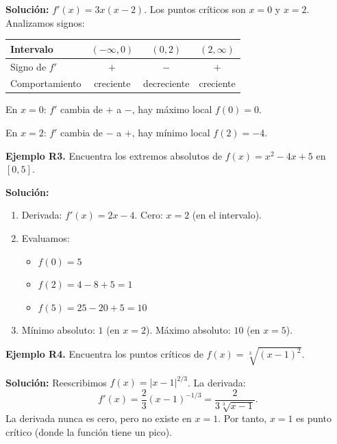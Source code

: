\documentclass[12pt, a4paper]{article}
\begin{document}
\begin{cuadrosolucion}
  \textbf{Solución:} $f'(x) = 3x(x - 2)$. Los puntos críticos son $x = 0$ y $x = 2$. Analizamos signos:
  \begin{center}
    \small
    \begin{tabular}{lccc}
      \toprule
      \textbf{Intervalo} & $(-\infty, 0)$ & $(0, 2)$    & $(2, \infty)$ \\
      \midrule
      Signo de $f'$      & $+$            & $-$         & $+$           \\
      Comportamiento     & creciente      & decreciente & creciente     \\
      \bottomrule
    \end{tabular}
  \end{center}
  En $x = 0$: $f'$ cambia de $+$ a $-$, hay máximo local $f(0) = 0$.

  En $x = 2$: $f'$ cambia de $-$ a $+$, hay mínimo local $f(2) = -4$.
\end{cuadrosolucion}

\textbf{Ejemplo R3.} Encuentra los extremos absolutos de $f(x) = x^2 - 4x + 5$ en $[0, 5]$.

\begin{cuadrosolucion}
  \textbf{Solución:}
  \begin{enumerate}
    \item Derivada: $f'(x) = 2x - 4$. Cero: $x = 2$ (en el intervalo).
    \item Evaluamos:
          \begin{itemize}
            \item $f(0) = 5$
            \item $f(2) = 4 - 8 + 5 = 1$
            \item $f(5) = 25 - 20 + 5 = 10$
          \end{itemize}
    \item Mínimo absoluto: $1$ (en $x = 2$). Máximo absoluto: $10$ (en $x = 5$).
  \end{enumerate}
\end{cuadrosolucion}

\newpage

\textbf{Ejemplo R4.} Encuentra los puntos críticos de $f(x) = \sqrt[3]{(x - 1)^2}$.

\begin{cuadrosolucion}
  \textbf{Solución:} Reescribimos $f(x) = |x - 1|^{2/3}$. La derivada:
  $$f'(x) = \frac{2}{3}(x - 1)^{-1/3} = \frac{2}{3\sqrt[3]{x - 1}}.$$
  La derivada nunca es cero, pero no existe en $x = 1$. Por tanto, $x = 1$ es punto crítico (donde la función tiene un pico).
\end{cuadrosolucion}
\end{document}
